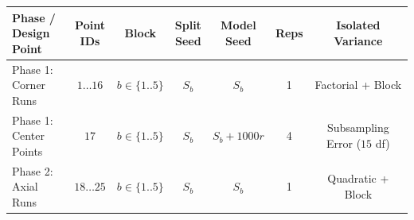 \begin{tabular}{lcccccc}
\toprule
\makecell{\textbf{Phase /}\\\textbf{Design Point}} & \makecell{\textbf{Point}\\\textbf{IDs}} & \textbf{Block} & \makecell{\textbf{Split}\\\textbf{Seed}} & \makecell{\textbf{Model}\\\textbf{Seed}} & \textbf{Reps} & \makecell{\textbf{Isolated}\\\textbf{Variance}} \\
\midrule
\makecell[l]{Phase 1:\\Corner Runs} & $1 \dots 16$ & $b \in \{1..5\}$ & $S_b$ & $S_b$ & 1 & Factorial + Block \\
\makecell[l]{Phase 1:\\Center Points} & $17$ & $b \in \{1..5\}$ & $S_b$ & $S_b + 1000r$ & 4 & \makecell{Subsampling Error\\($15$ df)} \\
\makecell[l]{Phase 2:\\Axial Runs} & $18 \dots 25$ & $b \in \{1..5\}$ & $S_b$ & $S_b$ & 1 & Quadratic + Block \\
\bottomrule
\end{tabular}
